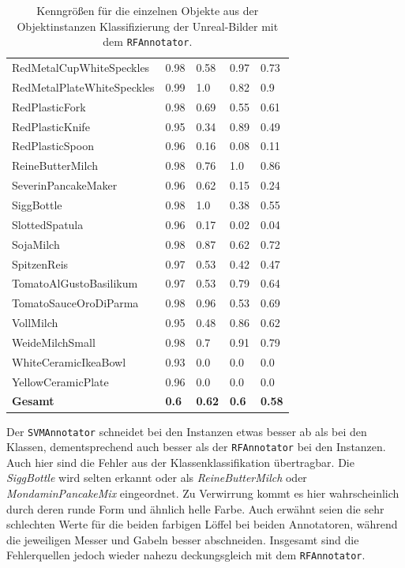 \begin{table}
\begin{tabularx}{\textwidth}{Xllll}
RedMetalCupWhiteSpeckles & 0.98 & 0.58 & 0.97 & 0.73 \\  
RedMetalPlateWhiteSpeckles & 0.99 & 1.0 & 0.82 & 0.9 \\  
RedPlasticFork & 0.98 & 0.69 & 0.55 & 0.61 \\  
RedPlasticKnife & 0.95 & 0.34 & 0.89 & 0.49 \\  
RedPlasticSpoon & 0.96 & 0.16 & 0.08 & 0.11 \\  
ReineButterMilch & 0.98 & 0.76 & 1.0 & 0.86 \\  
SeverinPancakeMaker & 0.96 & 0.62 & 0.15 & 0.24 \\  
SiggBottle & 0.98 & 1.0 & 0.38 & 0.55 \\  
SlottedSpatula & 0.96 & 0.17 & 0.02 & 0.04 \\  
SojaMilch & 0.98 & 0.87 & 0.62 & 0.72 \\  
SpitzenReis & 0.97 & 0.53 & 0.42 & 0.47 \\  
TomatoAlGustoBasilikum & 0.97 & 0.53 & 0.79 & 0.64 \\  
TomatoSauceOroDiParma & 0.98 & 0.96 & 0.53 & 0.69 \\  
VollMilch & 0.95 & 0.48 & 0.86 & 0.62 \\  
WeideMilchSmall & 0.98 & 0.7 & 0.91 & 0.79 \\  
WhiteCeramicIkeaBowl & 0.93 & 0.0 & 0.0 & 0.0 \\  
YellowCeramicPlate & 0.96 & 0.0 & 0.0 & 0.0 \\   \hline
\textbf{Gesamt}		&	\textbf{0.6}   &	\textbf{0.62}  & \textbf{0.6}     &  \textbf{0.58}     \\
\end{tabularx}
\caption[Objektinstanzen-spezifische Kenngrößen des RFAnnotators]{Kenngrößen für die einzelnen Objekte aus der Objektinstanzen Klassifizierung der Unreal-Bilder mit dem \texttt{RFAnnotator}.}
\label{tab:RFClassifierGTInstance_metrics}
\end{table}

Der \texttt{SVMAnnotator} schneidet bei den Instanzen etwas besser ab als bei den Klassen, dementsprechend auch besser als der \texttt{RFAnnotator} bei den Instanzen. Auch hier sind die Fehler aus der Klassenklassifikation übertragbar. Die \textit{SiggBottle} wird selten erkannt oder als \textit{ReineButterMilch} oder \textit{MondaminPancakeMix} eingeordnet. Zu Verwirrung kommt es hier wahrscheinlich durch deren runde Form und ähnlich helle Farbe. Auch erwähnt seien die sehr schlechten Werte für die beiden farbigen Löffel bei beiden Annotatoren, während die jeweiligen Messer und Gabeln besser abschneiden. Insgesamt sind die Fehlerquellen jedoch wieder nahezu deckungsgleich mit dem \texttt{RFAnnotator}.

